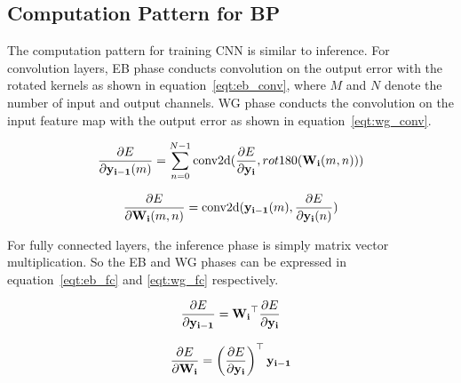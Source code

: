 \subsection{Computation Pattern for BP}
The computation pattern for training CNN is similar to inference. For convolution layers, EB phase conducts convolution on the output error with the rotated kernels as shown in equation~\ref{eqt:eb_conv}, where $M$ and $N$ denote the number of input and output channels. WG phase conducts the convolution on the input feature map with the output error as shown in equation~\ref{eqt:wg_conv}.

\begin{equation}\label{eqt:eb_conv}
  \frac{\partial E}{\partial \mathbf{y_{i-1}}(m)} = \sum\limits_{n=0}^{N-1}\text{conv2d}(\frac{\partial E}{\partial \mathbf{y_i}}, rot180(\mathbf{W_i}(m,n)))
\end{equation}

\begin{equation}\label{eqt:wg_conv}
  \frac{\partial E}{\partial \mathbf{W_i}(m, n)} = \text{conv2d}(\mathbf{y_{i-1}}(m), \frac{\partial E}{\partial \mathbf{y_i}(n)})
\end{equation}

For fully connected layers, the inference phase is simply matrix vector multiplication. So the EB and WG phases can be expressed in equation~\ref{eqt:eb_fc} and \ref{eqt:wg_fc} respectively.

\begin{equation}\label{eqt:eb_fc}
  \frac{\partial E}{\partial \mathbf{y_{i-1}}} = \mathbf{W_i}^\top \frac{\partial E}{\partial \mathbf{y_i}}
\end{equation}

\begin{equation}\label{eqt:wg_fc}
  \frac{\partial E}{\partial \mathbf{W_i}} = \left( \frac{\partial E}{\partial \mathbf{y_i}} \right)^\top \mathbf{y_{i-1}} 
\end{equation}

